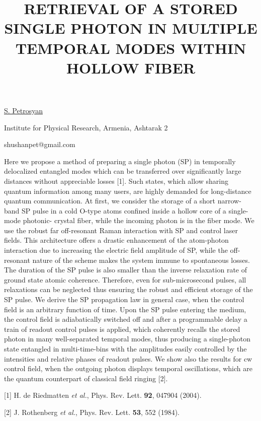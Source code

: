 \title{RETRIEVAL OF A STORED SINGLE PHOTON IN MULTIPLE TEMPORAL MODES WITHIN HOLLOW FIBER}

\underline{S. Petrosyan} 

{\normalsize{\vspace{-4mm}
Institute for Physical Research, Armenia, Ashtarak 2

\email shushanpet@gmail.com}}

Here we propose a method of preparing a single photon (SP) in temporally delocalized entangled
modes which can be transferred over significantly large distances without appreciable losses [1].
Such states, which allow sharing quantum information among many users, are highly demanded
for long-distance quantum communication. At first, we consider the storage of a short narrow-
band SP pulse in a cold O-type atoms confined inside a hollow core of a single-mode photonic-
crystal fiber, while the incoming photon is in the fiber mode. We use the robust far off-resonant
Raman interaction with SP and control laser fields. This architecture offers a drastic enhancement
of the atom-photon interaction due to increasing the electric field amplitude of SP, while the off-
resonant nature of the scheme makes the system immune to spontaneous losses. The duration of the
SP pulse is also smaller than the inverse relaxation rate of ground state atomic coherence. Therefore, even for sub-microsecond pulses, all relaxations can be neglected thus ensuring the robust and efficient storage of the SP pulse. We derive the SP propagation law in general case, when the control field is an arbitrary function of time. Upon the SP pulse entering the medium, the control field is adiabatically switched off and after a programmable delay a train of readout control pulses is applied, which coherently recalls the stored photon in many well-separated temporal modes, thus producing a single-photon state entangled in multi-time-bins with the amplitudes easily controlled by the intensities and relative phases of readout pulses. We show also the results for cw control field, when the outgoing photon displays temporal oscillations, which are the quantum counterpart of classical field ringing [2].

{\normalsize
[1] H. de Riedmatten \textit{et al.}, Phys. Rev. Lett. \textbf{92}, 047904 (2004).
\vsp

[2] J. Rothenberg \textit{et al.}, Phys. Rev. Lett. \textbf{53}, 552 (1984).
}

\vspace{\baselineskip}
